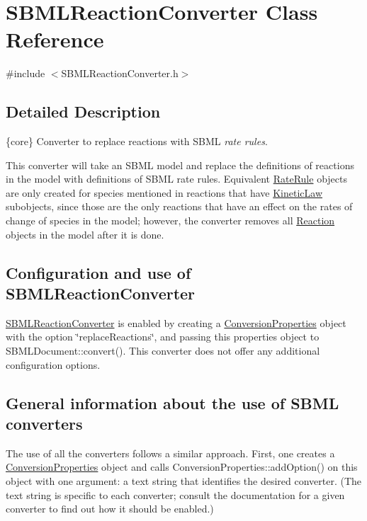 \hypertarget{class_s_b_m_l_reaction_converter}{}\section{S\+B\+M\+L\+Reaction\+Converter Class Reference}
\label{class_s_b_m_l_reaction_converter}


{\ttfamily \#include $<$S\+B\+M\+L\+Reaction\+Converter.\+h$>$}



\subsection{Detailed Description}
\{core\} Converter to replace reactions with S\+B\+ML {\itshape rate rules}.



This converter will take an S\+B\+ML model and replace the definitions of reactions in the model with definitions of S\+B\+ML rate rules. Equivalent \hyperlink{class_rate_rule}{Rate\+Rule} objects are only created for species mentioned in reactions that have \hyperlink{class_kinetic_law}{Kinetic\+Law} subobjects, since those are the only reactions that have an effect on the rates of change of species in the model; however, the converter removes all \hyperlink{class_reaction}{Reaction} objects in the model after it is done.\hypertarget{class_s_b_m_l_reaction_converter_SBMLReactionConverter-usage}{}\subsection{Configuration and use of S\+B\+M\+L\+Reaction\+Converter}\label{class_s_b_m_l_reaction_converter_SBMLReactionConverter-usage}
\hyperlink{class_s_b_m_l_reaction_converter}{S\+B\+M\+L\+Reaction\+Converter} is enabled by creating a \hyperlink{class_conversion_properties}{Conversion\+Properties} object with the option {\ttfamily \char`\"{}replace\+Reactions\char`\"{}}, and passing this properties object to S\+B\+M\+L\+Document\+::convert(). This converter does not offer any additional configuration options.\hypertarget{classdoc__section__using__sbml__converters_using-converters}{}\subsection{General information about the use of S\+B\+M\+L converters}\label{classdoc__section__using__sbml__converters_using-converters}
The use of all the converters follows a similar approach. First, one creates a \hyperlink{class_conversion_properties}{Conversion\+Properties} object and calls Conversion\+Properties\+::add\+Option() on this object with one argument\+: a text string that identifies the desired converter. (The text string is specific to each converter; consult the documentation for a given converter to find out how it should be enabled.)

